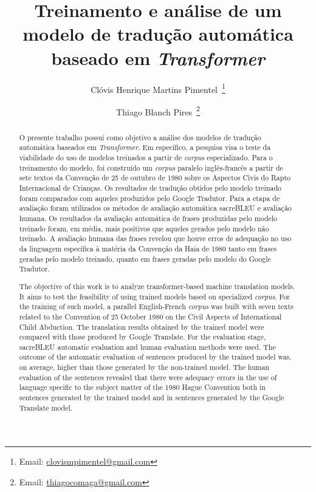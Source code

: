 \documentclass[portuguese]{textolivre}
\title{Treinamento e análise de um modelo de tradução automática baseado em \textit{Transformer}}
\author[1]{Clóvis Henrique Martins Pimentel~\orcid{0009-0008-7049-7688}\thanks{Email: \href{mailto:clovismpimentel@gmail.com}{clovismpimentel@gmail.com}}}
\author[1]{Thiago Blanch Pires~\orcid{0000-0002-0060-6075}\thanks{Email: \href{mailto:thiagocomaga@gmail.com}{thiagocomaga@gmail.com}}}
\affil[1]{Universidade de Brasília, Brasília, DF, Brasil.}
\begin{document}
\maketitle
\begin{polyabstract}
\begin{abstract}
O presente trabalho possui como objetivo a análise dos modelos de tradução automática baseados em \textit{Transformer}. Em específico, a pesquisa visa o teste da viabilidade do uso de modelos treinados a partir de \textit{corpus} especializado. Para o treinamento do modelo, foi construído um \textit{corpus} paralelo inglês-francês a partir de sete textos da Convenção de 25 de outubro de 1980 sobre os Aspectos Civis do Rapto Internacional de Crianças. Os resultados de tradução obtidos pelo modelo treinado foram comparados com aqueles produzidos pelo Google Tradutor. Para a etapa de avaliação foram utilizados os métodos de avaliação automática sacreBLEU e avaliação humana. Os resultados da avaliação automática de frases produzidas pelo modelo treinado foram, em média, mais positivos que aqueles gerados pelo modelo não treinado. A avaliação humana das frases revelou que houve erros de adequação no uso da linguagem específica à matéria da Convenção da Haia de 1980 tanto em frases geradas pelo modelo treinado, quanto em frases geradas pelo modelo do Google Tradutor.

\end{abstract}

\begin{english}
\begin{abstract}
The objective of this work is to analyze transformer-based machine translation models. It aims to test the feasibility of using trained models based on specialized \textit{corpus}. For the training of such model, a parallel English-French \textit{corpus} was built with seven texts related to the Convention of 25 October 1980 on the Civil Aspects of International Child Abduction. The translation results obtained by the trained model were compared with those produced by Google Translate. For the evaluation stage, sacreBLEU automatic evaluation and human evaluation methods were used. The outcome of the automatic evaluation of sentences produced by the trained model was, on average, higher than those generated by the non-trained model. The human evaluation of the sentences revealed that there were adequacy errors in the use of language specific to the subject matter of the 1980 Hague Convention both in sentences generated by the trained model and in sentences generated by the Google Translate model.

\end{abstract}
\end{english}
\end{polyabstract}
\end{document}
